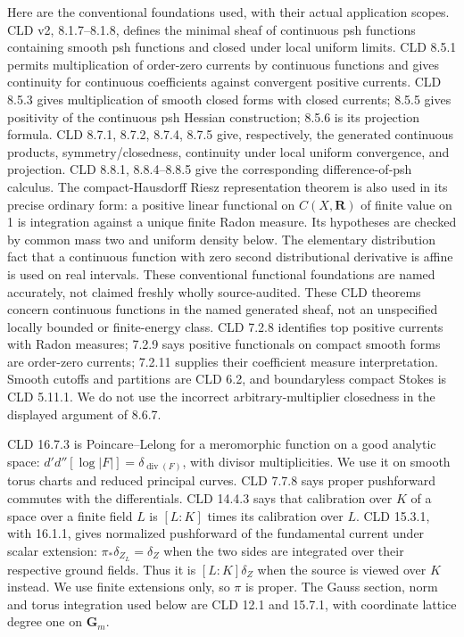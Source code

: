 \documentclass[11pt]{article}
\begin{document}
Here are the conventional foundations used, with their actual application scopes.
CLD v2, 8.1.7--8.1.8, defines the minimal sheaf of continuous psh functions
containing smooth psh functions and closed under local uniform limits.
CLD 8.5.1 permits multiplication of order-zero currents by continuous functions
and gives continuity for continuous coefficients against convergent positive
currents. CLD 8.5.3 gives multiplication of smooth closed forms with closed
currents; 8.5.5 gives positivity of the continuous psh Hessian construction;
8.5.6 is its projection formula. CLD 8.7.1, 8.7.2, 8.7.4, 8.7.5 give,
respectively, the generated continuous products, symmetry/closedness,
continuity under local uniform convergence, and projection. CLD 8.8.1,
8.8.4--8.8.5 give the corresponding difference-of-psh calculus.
The compact-Hausdorff Riesz representation theorem is also used in its precise
ordinary form: a positive linear functional on $C(X,\mathbf R)$ of finite
value on 1 is integration against a unique finite Radon measure. Its hypotheses
are checked by common mass two and uniform density below. The elementary
distribution fact that a continuous function with zero second distributional
derivative is affine is used on real intervals. These conventional functional
foundations are named accurately, not claimed freshly wholly source-audited.
These CLD theorems concern continuous functions in the named generated sheaf,
not an unspecified locally bounded or finite-energy class.
CLD 7.2.8 identifies top positive currents with Radon measures; 7.2.9 says
positive functionals on compact smooth forms are order-zero currents;
7.2.11 supplies their coefficient measure interpretation.
Smooth cutoffs and partitions are CLD 6.2, and boundaryless compact Stokes
is CLD 5.11.1. We do not use the incorrect arbitrary-multiplier closedness
in the displayed argument of 8.6.7.

CLD 16.7.3 is Poincare--Lelong for a meromorphic function on a good analytic
space: $d'd''[\log|F|]=\delta_{\operatorname{div}(F)}$, with divisor
multiplicities. We use it on smooth torus charts and reduced principal curves.
CLD 7.7.8 says proper pushforward commutes with the differentials.
CLD 14.4.3 says that calibration over $K$ of a space over a finite field $L$
is $[L:K]$ times its calibration over $L$.
CLD 15.3.1, with 16.1.1, gives normalized pushforward of the fundamental
current under scalar extension: $\pi_*\delta_{Z_L}=\delta_Z$ when the two
sides are integrated over their respective ground fields. Thus it is
$[L:K]\delta_Z$ when the source is viewed over $K$ instead.
We use finite extensions only, so $\pi$ is proper.
The Gauss section, norm and torus integration used below are CLD 12.1 and
15.7.1, with coordinate lattice degree one on $\mathbf G_m$.
\end{document}
